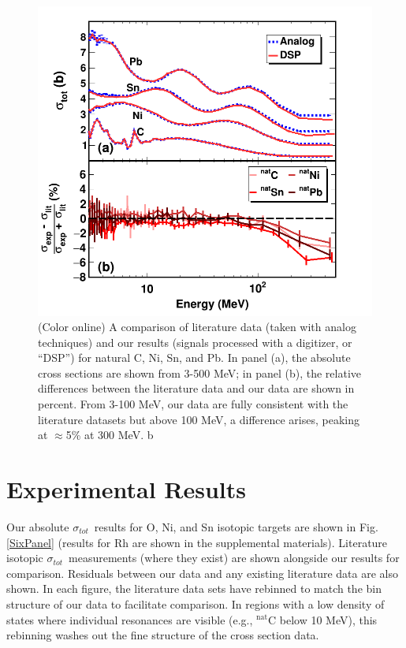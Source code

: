 \documentclass[twocolumn,secnumarabic,amssymb, nobibnotes, aps, prl,
superscriptaddress, nobalancelastpage, draft]{revtex4}
\newcommand{\tot}{\ensuremath{\sigma_{tot}}}
\begin{document}
\begin{figure}
    \includegraphics[width=\linewidth]{figures/literatureBenchmarking.png}
    \caption{(Color online) A comparison of literature data (taken with analog
    techniques) and our results (signals processed with a digitizer, or ``DSP'')
    for natural C, Ni, Sn, and Pb. In panel (a), the absolute cross sections are shown from
    3-500 MeV; in panel (b), the relative differences between the literature data and
    our data are shown in percent. From 3-100 MeV, our data are fully consistent with the
    literature datasets but above 100 MeV, a difference arises, peaking at
    $\approx$5\% at 300 MeV.
b}
    \label{LiteratureBenchmarking}
\end{figure}

\section{Experimental Results}
Our absolute \tot\ results for O, Ni, and Sn isotopic targets are shown in Fig.
\ref{SixPanel} (results for Rh are shown in the supplemental materials).
Literature isotopic \tot\ measurements
(where they exist) are shown alongside our results for comparison.
Residuals between our data and any existing literature data are also shown.
In each figure, the literature data sets have rebinned to match the bin
structure of our data to facilitate comparison. In regions with a low density of
states where individual resonances are visible (e.g., $^{\text{nat}}$C
below 10 MeV), this rebinning washes out the fine structure of the
cross section data.
\end{document}
